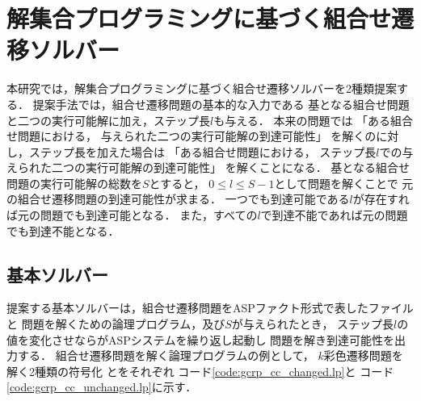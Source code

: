 \section{解集合プログラミングに基づく組合せ遷移ソルバー} \label{chap:proposal}

本研究では，解集合プログラミングに基づく組合せ遷移ソルバーを2種類提案する．
提案手法では，組合せ遷移問題の基本的な入力である
基となる組合せ問題と二つの実行可能解に加え，ステップ長$l$も与える．
本来の問題では
「ある組合せ問題における，
与えられた二つの実行可能解の到達可能性」
を解くのに対し，ステップ長を加えた場合は
「ある組合せ問題における，
ステップ長$l$での与えられた二つの実行可能解の到達可能性」
を解くことになる．
基となる組合せ問題の実行可能解の総数を$S$とすると，
$0 \le l \le S-1$として問題を解くことで
元の組合せ遷移問題の到達可能性が求まる．
一つでも到達可能である$l$が存在すれば元の問題でも到達可能となる．
また，すべての$l$で到達不能であれば元の問題でも到達不能となる．

\subsection{基本ソルバー} \label{sec:based_solver}

提案する基本ソルバーは，組合せ遷移問題をASPファクト形式で表したファイルと
問題を解くための論理プログラム，及び$S$が与えられたとき，
ステップ長$l$の値を変化させならがASPシステムを繰り返し起動し
問題を解き到達可能性を出力する．
組合せ遷移問題を解く論理プログラムの例として，
$k$彩色遷移問題を解く2種類の符号化
とをそれぞれ
コード\ref{code:gcrp_cc_changed.lp}と
コード\ref{code:gcrp_cc_unchanged.lp}に示す．





